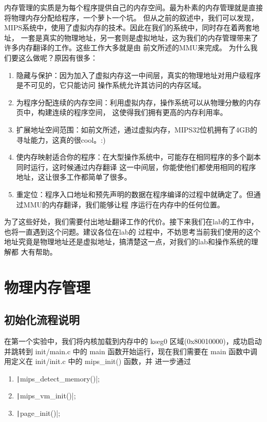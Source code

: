   内存管理的实质是为每个程序提供自己的内存空间。最为朴素的内存管理就是直接将物理内存分配给程序，一个萝卜一个坑。
  但从之前的叙述中，我们可以发现，MIPS系统中，使用了虚拟内存的技术。因此在我们的系统中，同时存在着两套地址，
  一套是真实的物理地址，另一套则是虚拟地址，这为我们的内存管理带来了许多内存翻译的工作。这些工作大多就是由
  前文所述的MMU来完成。
  为什么我们要这么做呢？原因有很多：
    \begin{enumerate}
      \item 隐藏与保护：因为加入了虚拟内存这一中间层，真实的物理地址对用户级程序是不可见的，它只能访问
      操作系统允许其访问的内存区域。
      \item 为程序分配连续的内存空间：利用虚拟内存，操作系统可以从物理分散的内存页中，构建连续的程序空间，
      这使得我们拥有更高的内存利用率。
      \item 扩展地址空间范围：如前文所述，通过虚拟内存，MIPS32位机拥有了4GB的寻址能力，这真的很cool。:)
      \item 使内存映射适合你的程序：在大型操作系统中，可能存在相同程序的多个副本同时运行，这时候通过内存翻译
      这一中间层，你能使他们都使用相同的程序地址，这让很多工作都简单了很多。
      \item 重定位：程序入口地址和预先声明的数据在程序编译的过程中就确定了。但通过MMU的内存翻译，我们能够让程
      序运行在内存中的任何位置。
    \end{enumerate}
  为了这些好处，我们需要付出地址翻译工作的代价。接下来我们在lab的工作中，也将一直遇到这个问题。建议各位在lab的
  过程中，不妨思考当前我们使用的这个地址究竟是物理地址还是虚拟地址，搞清楚这一点，对我们的lab和操作系统的理解都
  大有帮助。

\section{物理内存管理}

\subsection{初始化流程说明}
  在第一个实验中，我们将内核加载到内存中的 kseg0 区域(0x80010000)，成功启动并跳转到 init/main.c 中的
   main 函数开始运行，现在我们需要在 main 函数中调用定义在 init/init.c 中的 mips\_init() 函数，并
  进一步通过

  \begin{enumerate}
    \item \texttt|mips_detect_memory()|;
    \item \texttt|mips_vm_init()|;
    \item \texttt|page_init()|;
  \end{enumerate}


